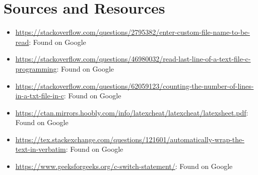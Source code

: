 \documentclass{article}
\begin{document}
\newpage

\section{Sources and Resources}

\begin{flushleft}
\begin{itemize}
    \item{\url{https://stackoverflow.com/questions/2795382/enter-custom-file-name-to-be-read}: Found on Google}
    \item{\url{https://stackoverflow.com/questions/46980032/read-last-line-of-a-text-file-c-programming}: Found on Google}
    \item{\url{https://stackoverflow.com/questions/62059123/counting-the-number-of-lines-in-a-txt-file-in-c}: Found on Google}
    \item{\url{https://ctan.mirrors.hoobly.com/info/latexcheat/latexcheat/latexsheet.pdf}: Found on Google}
    \item{\url{https://tex.stackexchange.com/questions/121601/automatically-wrap-the-text-in-verbatim}: Found on Google}
    \item{\url{https://www.geeksforgeeks.org/c-switch-statement/}: Found on Google}    
\end{itemize}
\end{flushleft}
\end{document}
